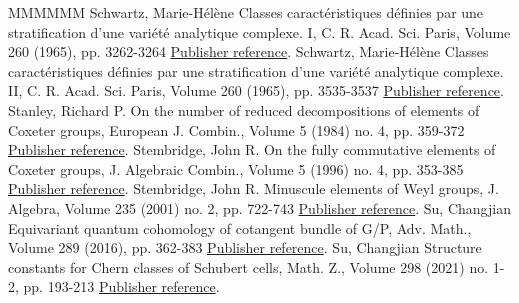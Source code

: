 \begin{thebibliography}{MMMMMM}
 Schwartz, Marie-Hélène Classes caractéristiques définies par une stratification d’une variété analytique complexe. I, C. R. Acad. Sci. Paris, Volume 260 (1965), pp. 3262-3264 \href{https://alco.centre-mersenne.org/articles/10.5802/alco.428/#schwartz:1}{Publisher reference}.
 Schwartz, Marie-Hélène Classes caractéristiques définies par une stratification d’une variété analytique complexe. II, C. R. Acad. Sci. Paris, Volume 260 (1965), pp. 3535-3537 \href{https://alco.centre-mersenne.org/articles/10.5802/alco.428/#schwartz:2}{Publisher reference}.
 Stanley, Richard P. On the number of reduced decompositions of elements of Coxeter groups, European J. Combin., Volume 5 (1984) no. 4, pp. 359-372 \href{https://alco.centre-mersenne.org/articles/10.5802/alco.428/#stanley:reduced}{Publisher reference}.
 Stembridge, John R. On the fully commutative elements of Coxeter groups, J. Algebraic Combin., Volume 5 (1996) no. 4, pp. 353-385 \href{https://alco.centre-mersenne.org/articles/10.5802/alco.428/#stembridge:fullycomm}{Publisher reference}.
 Stembridge, John R. Minuscule elements of Weyl groups, J. Algebra, Volume 235 (2001) no. 2, pp. 722-743 \href{https://alco.centre-mersenne.org/articles/10.5802/alco.428/#stembridge2001minuscule}{Publisher reference}.
 Su, Changjian Equivariant quantum cohomology of cotangent bundle of G/P, Adv. Math., Volume 289 (2016), pp. 362-383 \href{https://alco.centre-mersenne.org/articles/10.5802/alco.428/#su:quantum}{Publisher reference}.
 Su, Changjian Structure constants for Chern classes of Schubert cells, Math. Z., Volume 298 (2021) no. 1-2, pp. 193-213 \href{https://alco.centre-mersenne.org/articles/10.5802/alco.428/#su:structure}{Publisher reference}.
\end{thebibliography}
